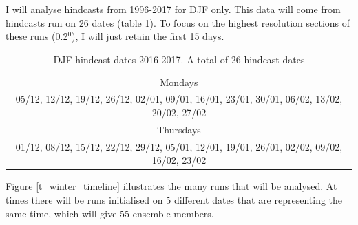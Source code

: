 




I will analyse hindcasts from 1996-2017 for DJF only. This data will come from hindcasts run on 26 dates (table \ref{t_winterdates}). To focus on the highest resolution sections of these runs (0.2$^0$), I will just retain the first 15 days.

\begin{table}[h]
	\caption{DJF hindcast dates 2016-2017. A total of 26 hindcast dates}\label{t_winterdates}
	\begin{center}
		\begin{tabular}{c}
			\hline\hline
			Mondays \\
			05/12, 12/12, 19/12, 26/12, 02/01, 09/01, 16/01, 23/01, 30/01, 06/02, 13/02, 20/02, 27/02 \\ 
			\hline
			Thursdays \\			
			01/12, 08/12, 15/12, 22/12, 29/12, 05/01, 12/01, 19/01, 26/01, 02/02, 09/02, 16/02, 23/02  \\ 			
			\hline
		\end{tabular}
	\end{center}
\end{table}

Figure \ref{t_winter_timeline} illustrates the many runs that will be analysed. At times there will be runs initialised on 5 different dates that are representing the same time, which will give 55 ensemble members.

